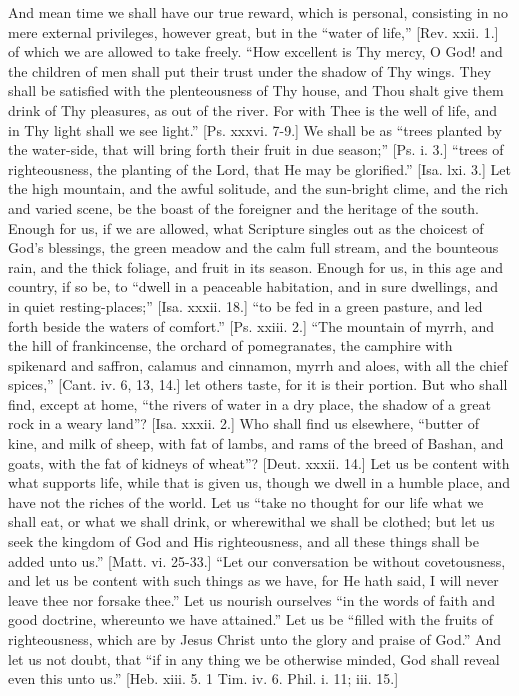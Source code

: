 And mean time we shall have our true reward, which is personal,
consisting in no mere external privileges, however great, but in the
``water of life,'' [Rev. xxii. 1.] of which we are allowed to
take freely. ``How excellent is Thy mercy, O God! and the children
of men shall put their trust under the shadow of Thy wings. They shall
be satisfied with the plenteousness of Thy house, and Thou shalt give
them drink of Thy pleasures, as out of the river. For with Thee is the
well of life, and in Thy light shall we see light.'' [Ps. xxxvi.
7-9.] We shall be as ``trees planted by the water-side, that will
bring forth their fruit in due season;'' [Ps. i. 3.] ``trees
of righteousness, the planting of the Lord, that He may be
glorified.'' [Isa. lxi. 3.] Let the high mountain, and the awful
solitude, and the sun-bright clime, and the rich and varied scene, be
the boast of the foreigner and the heritage of the south. Enough for
us, if we are allowed, what Scripture singles out as the choicest of
God's blessings, the green meadow and the calm full stream, and the
bounteous rain, and the thick foliage, and fruit in its season. Enough
for us, in this age and country, if so be, to ``dwell in a
peaceable habitation, and in sure dwellings, and in quiet
resting-places;'' [Isa. xxxii. 18.] ``to be fed in a green
pasture, and led forth beside the waters of comfort.'' [Ps. xxiii.
2.] ``The mountain of myrrh, and the hill of frankincense, the
orchard of pomegranates, the camphire with spikenard and saffron,
calamus and cinnamon, myrrh and aloes, with all the chief
spices,'' [Cant. iv. 6, 13, 14.] let others taste, for it is their
portion. But who shall find, except at home, ``the rivers of water
in a dry place, the shadow of a great rock in a weary land''? [Isa.
xxxii. 2.] Who shall find us elsewhere, ``butter of kine, and milk
of sheep, with fat of lambs, and rams of the breed of Bashan, and
goats, with the fat of kidneys of wheat''? [Deut. xxxii. 14.] Let
us be content with what supports life, while that is given us, though
we dwell in a humble place, and have not the riches of the world. Let
us ``take no thought for our life what we shall eat, or what we
shall drink, or wherewithal we shall be clothed; but let us seek the
kingdom of God and His righteousness, and all these things shall be
added unto us.'' [Matt. vi. 25-33.] ``Let our conversation be
without covetousness, and let us be content with such things as we
have, for He hath said, I will never leave thee nor forsake
thee.'' Let us nourish ourselves ``in the words of faith and
good doctrine, whereunto we have attained.'' Let us be
``filled with the fruits of righteousness, which are by Jesus
Christ unto the glory and praise of God.'' And let us not doubt,
that ``if in any thing we be otherwise minded, God shall reveal
even this unto us.'' [Heb. xiii. 5. 1 Tim. iv. 6. Phil. i. 11;
iii. 15.]

